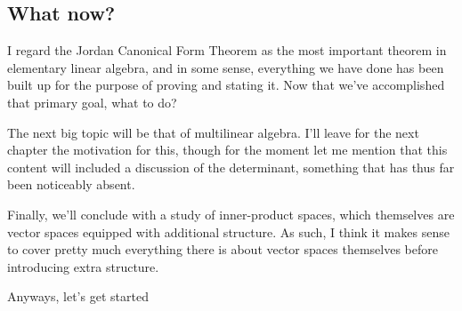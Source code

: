 \subsection{What now?}

I regard the Jordan Canonical Form Theorem as the most important theorem in elementary linear algebra, and in some sense, everything we have done has been built up for the purpose of proving and stating it.  Now that we've accomplished that primary goal, what to do?

The next big topic will be that of multilinear algebra.  I'll leave for the next chapter the motivation for this, though for the moment let me mention that this content will included a discussion of the determinant, something that has thus far been noticeably absent.

Finally, we'll conclude with a study of inner-product spaces, which themselves are vector spaces equipped with additional structure.  As such, I think it makes sense to cover pretty much everything there is about vector spaces themselves before introducing extra structure.

Anyways, let's get started\textellipsis